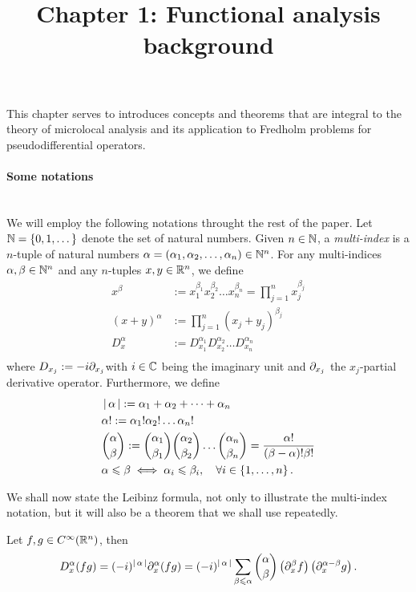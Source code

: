 \documentclass[12pt]{article}
\title{Chapter 1: Functional analysis background}
\date{}
\begin{document}
\maketitle

This chapter serves to introduces concepts and theorems that are integral to the theory of microlocal analysis and its application to Fredholm problems for pseudodifferential operators. 

\paragraph{Some notations} \hfill \\
We will employ the following notations throught the rest of the paper. Let ${\mathbb N} = \left\{0, 1, \dots\right\}$ denote the set of natural numbers. Given $n \in {\ensuremath {\mathbb N}}$, a \textit{multi-index} is a $n$-tuple of natural numbers $\alpha = (\alpha_1, \alpha_2, \dots, \alpha_n) \in {\ensuremath {\mathbb N}}^n$. For any multi-indices $\alpha, \beta \in {\ensuremath {\mathbb N}}^n$ and  any $n$-tuples $x, y \in {\ensuremath {\mathbb R}}^n$, we define
\begin{align*}
x^\beta &:= x_1^{\beta_1} x_2^{\beta_2}\dots x_n^{\beta_n} = \prod_{j = 1}^n x_j^{\beta_j}\\
 (x + y)^\alpha &:= \prod_{j = 1}^n (x_j + y_j)^{\beta_j} \\
D^\alpha_x &:= D_{x_1}^{\alpha_1} D_{x_2}^{\alpha_2} \dots D_{x_n}^{\alpha_n}\\
\end{align*}
where $D_{x_j} := - i \partial_{x_j}$with $i \in {\ensuremath {\mathbb C}}$ being the imaginary unit and $\partial_{x_j} $ the $x_j$-partial derivative operator. Furthermore, we define
\begin{align*}
&\left|\, \alpha\,\right| := \alpha_1 + \alpha_2 + \dots + \alpha_n\\
& \alpha! := \alpha_1! \alpha_2! \dots \alpha_n! \\
& \binom{\alpha}{\beta} := \binom{\alpha_1}{\beta_1} \binom{\alpha_2}{ \beta_2} \dots \binom{\alpha_n}{\beta_n} = \frac{\alpha!}{(\beta - \alpha)! \beta!} \\
&\alpha \leqslant \beta \iff \alpha_i \leqslant \beta_i, \quad \forall i \in \left\{1, \dots, n\right\}. 
\end{align*}

We shall now state the Leibinz formula, not only to illustrate the multi-index notation, but it will also be a theorem that we shall use repeatedly. 
\begin{ftheorem}
    Let $f, g \in C^\infty({\mathbb R}^n)$, then 
    \begin{align*}
    D^\alpha_x (fg) = (-i)^{\left|\, \alpha\,\right|} \partial_x^\alpha(fg) = (-i)^{\left|\, \alpha\,\right|} \sum_{\beta \leqslant \alpha} \binom{\alpha}{\beta}  \left(\partial_x^\beta f\right) \left(\partial_x^{\alpha - \beta}g\right). 
    \end{align*}
\end{ftheorem}
\end{document}
